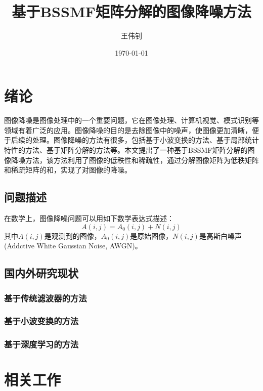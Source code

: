 \documentclass[12pt]{article}
\title{基于BSSMF矩阵分解的图像降噪方法}
\author{王伟钊}
\date{\today}
\begin{document}
\maketitle

\begin{abstract}

\end{abstract}

\tableofcontents

\section{绪论}
图像降噪是图像处理中的一个重要问题，它在图像处理、计算机视觉、模式识别等领域有着广泛的应用。图像降噪的目的是去除图像中的噪声，使图像更加清晰，便于后续的处理。图像降噪的方法有很多，包括基于小波变换的方法、基于局部统计特性的方法、基于矩阵分解的方法等。本文提出了一种基于BSSMF矩阵分解的图像降噪方法，该方法利用了图像的低秩性和稀疏性，通过分解图像矩阵为低秩矩阵和稀疏矩阵的和，实现了对图像的降噪。

\subsection{问题描述}
在数学上，图像降噪问题可以用如下数学表达式描述\cite{SVDWhiteNoise}：
\begin{equation}
    A(i,j)=A_{0}(i,j)+N(i,j)
\end{equation}
其中$A(i,j)$是观测到的图像，$A_{0}(i,j)$是原始图像，$N(i,j)$是高斯白噪声(Addctive White Gaussian Noise, AWGN)\cite{AWGN}。

\subsection{国内外研究现状}
\subsubsection{基于传统滤波器的方法}
\subsubsection{基于小波变换的方法}
\subsubsection{基于深度学习的方法}

\section{相关工作}
\end{document}
